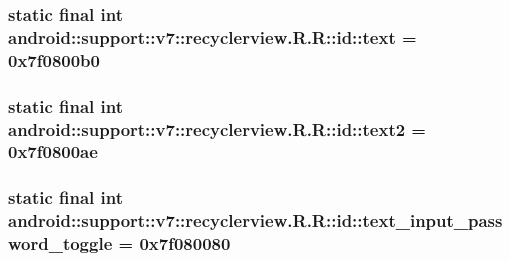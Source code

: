 \hypertarget{classandroid_1_1support_1_1v7_1_1recyclerview_1_1_r_1_1id_f5bcee7b0eda4b774ad5c96dca63ee1a}{
\subsubsection[{text}]{\setlength{\rightskip}{0pt plus 5cm}static final int android::support::v7::recyclerview.R.R::id::text = 0x7f0800b0}}
\label{classandroid_1_1support_1_1v7_1_1recyclerview_1_1_r_1_1id_f5bcee7b0eda4b774ad5c96dca63ee1a}


\hypertarget{classandroid_1_1support_1_1v7_1_1recyclerview_1_1_r_1_1id_48ca8c1d5774028b0de1b505038230bf}{
\subsubsection[{text2}]{\setlength{\rightskip}{0pt plus 5cm}static final int android::support::v7::recyclerview.R.R::id::text2 = 0x7f0800ae}}
\label{classandroid_1_1support_1_1v7_1_1recyclerview_1_1_r_1_1id_48ca8c1d5774028b0de1b505038230bf}


\hypertarget{classandroid_1_1support_1_1v7_1_1recyclerview_1_1_r_1_1id_718ddf516d59d444dfaa3c26a231afee}{
\subsubsection[{text\_\-input\_\-password\_\-toggle}]{\setlength{\rightskip}{0pt plus 5cm}static final int android::support::v7::recyclerview.R.R::id::text\_\-input\_\-password\_\-toggle = 0x7f080080}}
\label{classandroid_1_1support_1_1v7_1_1recyclerview_1_1_r_1_1id_718ddf516d59d444dfaa3c26a231afee}


